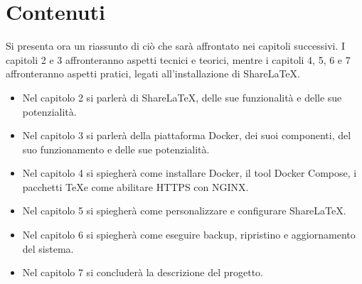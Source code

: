 \section{Contenuti}
Si presenta ora un riassunto di ciò che sarà affrontato nei capitoli successivi. I capitoli 2 e 3 affronteranno aspetti tecnici e teorici, mentre i capitoli 4, 5, 6 e 7 affronteranno aspetti pratici, legati all'installazione di ShareLaTeX.
\begin{itemize}
    \item Nel capitolo 2 si parlerà di ShareLaTeX, delle sue funzionalità e delle sue potenzialità.
    \item Nel capitolo 3 si parlerà della piattaforma Docker, dei suoi componenti, del suo funzionamento e delle sue potenzialità.
    \item Nel capitolo 4 si spiegherà come installare Docker, il tool Docker Compose, i pacchetti \TeX e come abilitare HTTPS con NGINX.
    \item Nel capitolo 5 si spiegherà come personalizzare e configurare ShareLaTeX.
    \item Nel capitolo 6 si spiegherà come eseguire backup, ripristino e aggiornamento del sistema.
    \item Nel capitolo 7 si concluderà la descrizione del progetto.
\end{itemize}